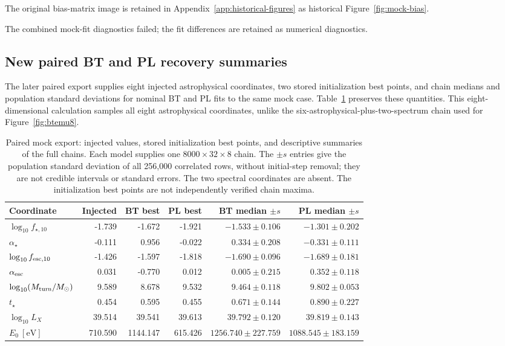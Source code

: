 The original bias-matrix image is retained in Appendix~\ref{app:historical-figures} as historical Figure~\ref{fig:mock-bias}.

The combined mock-fit diagnostics failed; the fit differences are retained as numerical diagnostics.

\subsection{New paired BT and PL recovery summaries}\label{paired-recovery-update}

The later paired export supplies eight injected astrophysical coordinates, two stored initialization best points, and chain medians and population standard deviations for nominal BT and PL fits to the same mock case. Table~\ref{tab:paired-recovery} preserves these quantities. This eight-dimensional calculation samples all eight astrophysical coordinates, unlike the six-astrophysical-plus-two-spectrum chain used for Figure~\ref{fig:btemu8}.

\begin{table}[t]\centering\small
\caption{Paired mock export: injected values, stored initialization best points, and descriptive summaries of the full chains. Each model supplies one $8000\times32\times8$ chain. The $\pm s$ entries give the population standard deviation of all 256,000 correlated rows, without initial-step removal; they are not credible intervals or standard errors. The two spectral coordinates are absent. The initialization best points are not independently verified chain maxima.}\label{tab:paired-recovery}
\begin{tabular*}{\textwidth}{@{\extracolsep{\fill}}lrrrrr}\toprule
Coordinate & Injected & BT best & PL best & BT median $\pm s$ & PL median $\pm s$\\\midrule
$\log_{10}f_{\star,10}$ & -1.739 & -1.672 & -1.921 & $-1.533\pm0.106$ & $-1.301\pm0.202$\\
$\alpha_\star$ & -0.111 & 0.956 & -0.022 & $0.334\pm0.208$ & $-0.331\pm0.111$\\
$\log_{10}f_{{\rm esc},10}$ & -1.426 & -1.597 & -1.818 & $-1.690\pm0.096$ & $-1.689\pm0.181$\\
$\alpha_{\rm esc}$ & 0.031 & -0.770 & 0.012 & $0.005\pm0.215$ & $0.352\pm0.118$\\
$\log_{10}(M_{\rm turn}/M_\odot)$ & 9.589 & 8.678 & 9.532 & $9.464\pm0.118$ & $9.802\pm0.053$\\
$t_\star$ & 0.454 & 0.595 & 0.455 & $0.671\pm0.144$ & $0.890\pm0.227$\\
$\log_{10}L_X$ & 39.514 & 39.541 & 39.613 & $39.792\pm0.120$ & $39.819\pm0.143$\\
$E_0\ [\mathrm{eV}]$ & 710.590 & 1144.147 & 615.426 & $1256.740\pm227.759$ & $1088.545\pm183.159$\\
\bottomrule\end{tabular*}\end{table}

